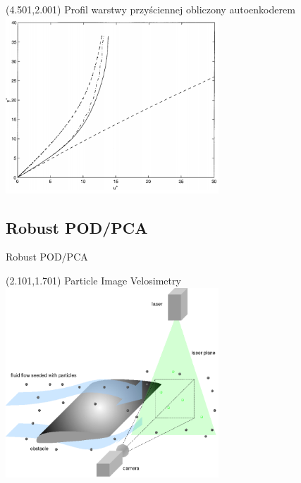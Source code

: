 \documentclass[aspectratio=169]{beamer}
\begin{document}
\begin{frame}
	\begin{textblock}{13}(4.501,2.001)
		Profil warstwy przyściennej obliczony autoenkoderem
		\includegraphics[width=8cm]{imgs/velocity2.png}
	\end{textblock}
\end{frame}

\subsection{Robust POD/PCA}
\begin{frame}{Robust POD/PCA}
	\begin{textblock}{13}(2.101,1.701)
	\qquad \qquad \qquad \qquad \qquad Particle Image Velosimetry
	\includegraphics[width=8cm]{imgs/piv.png}
	\end{textblock}
\end{frame}
\end{document}
